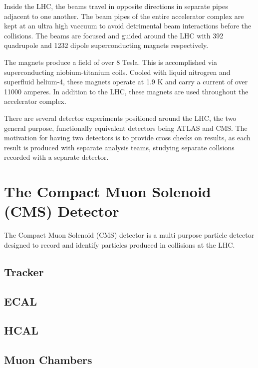 Inside the LHC, the beams travel in opposite directions in separate pipes adjacent to
one another. The beam pipes of the entire accelerator complex are kept at an ultra high vaccuum
to avoid detrimental beam interactions before the collisions. The beams are focused
and guided around the LHC with 392 quadrupole and 1232 dipole superconducting
magnets respectively.

The magnets produce a field of over 8 Tesla. This is accomplished via superconducting 
niobium-titanium coils. Cooled with liquid nitrogren and superfluid helium-4, these
magnets operate at 1.9 K and carry a current of over 11000 amperes. In addition to
the LHC, these magnets are used throughout the accelerator complex.

There are several detector experiments positioned around the LHC, the two general purpose, functionally equivalent detectors being ATLAS and CMS.
The motivation for having two detectors is to provide cross checks on results, as each result is produced with separate analysis teams, studying separate collsions
recorded with a separate detector.   

\section{The Compact Muon Solenoid (CMS) Detector}
The Compact Muon Solenoid (CMS) detector is a multi purpose particle detector designed to record and identify particles produced in collisions at the LHC. 

\subsection{Tracker}
\subsection{ECAL}
\subsection{HCAL}
\subsection{Muon Chambers}


%
% 
% 
